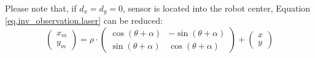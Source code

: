 		Please note that, if $d_x = d_y = 0$, \ie{} sensor is located into the robot center, Equation \ref{eq.inv_observation.laser} can be reduced:
		\[
			\left(\begin{array}{c}
				x_m \\ y_m
			\end{array}\right)
			=
			\rho \cdot
			\left(\begin{array}{ccc}
				\cos{(\theta + \alpha)} & -\sin{(\theta + \alpha)} \\
				\sin{(\theta + \alpha)} & \cos{(\theta + \alpha)}
			\end{array}\right)
			+
			\left(\begin{array}{c}
			x \\ y
			\end{array}\right)
		\]
		
		
		